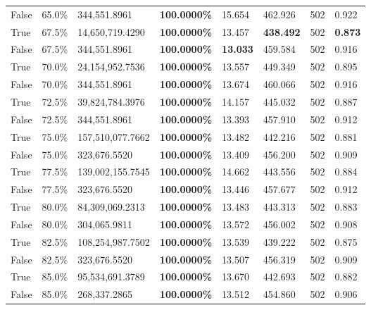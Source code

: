 \begin{table}[H]
{\begin{tabular}{lllrllll}
\cline{1-8}
False & 65.0\% & 344,551.8961 & \bfseries \color{red} 100.0000\% & 15.654 & 462.926 & 502 & 0.922 \\
\cline{1-8}
True & 67.5\% & 14,650,719.4290 & \bfseries \color{red} 100.0000\% & 13.457 & \bfseries \color{red} 438.492 & 502 & \bfseries \color{red} 0.873 \\
\cline{1-8}
False & 67.5\% & 344,551.8961 & \bfseries \color{red} 100.0000\% & \bfseries \color{red} 13.033 & 459.584 & 502 & 0.916 \\
\cline{1-8}
True & 70.0\% & 24,154,952.7536 & \bfseries \color{red} 100.0000\% & 13.557 & 449.349 & 502 & 0.895 \\
\cline{1-8}
False & 70.0\% & 344,551.8961 & \bfseries \color{red} 100.0000\% & 13.674 & 460.066 & 502 & 0.916 \\
\cline{1-8}
True & 72.5\% & 39,824,784.3976 & \bfseries \color{red} 100.0000\% & 14.157 & 445.032 & 502 & 0.887 \\
\cline{1-8}
False & 72.5\% & 344,551.8961 & \bfseries \color{red} 100.0000\% & 13.393 & 457.910 & 502 & 0.912 \\
\cline{1-8}
True & 75.0\% & 157,510,077.7662 & \bfseries \color{red} 100.0000\% & 13.482 & 442.216 & 502 & 0.881 \\
\cline{1-8}
False & 75.0\% & 323,676.5520 & \bfseries \color{red} 100.0000\% & 13.409 & 456.200 & 502 & 0.909 \\
\cline{1-8}
True & 77.5\% & 139,002,155.7545 & \bfseries \color{red} 100.0000\% & 14.662 & 443.556 & 502 & 0.884 \\
\cline{1-8}
False & 77.5\% & 323,676.5520 & \bfseries \color{red} 100.0000\% & 13.446 & 457.677 & 502 & 0.912 \\
\cline{1-8}
True & 80.0\% & 84,309,069.2313 & \bfseries \color{red} 100.0000\% & 13.483 & 443.313 & 502 & 0.883 \\
\cline{1-8}
False & 80.0\% & 304,065.9811 & \bfseries \color{red} 100.0000\% & 13.572 & 456.002 & 502 & 0.908 \\
\cline{1-8}
True & 82.5\% & 108,254,987.7502 & \bfseries \color{red} 100.0000\% & 13.539 & 439.222 & 502 & 0.875 \\
\cline{1-8}
False & 82.5\% & 323,676.5520 & \bfseries \color{red} 100.0000\% & 13.507 & 456.319 & 502 & 0.909 \\
\cline{1-8}
True & 85.0\% & 95,534,691.3789 & \bfseries \color{red} 100.0000\% & 13.670 & 442.693 & 502 & 0.882 \\
\cline{1-8}
False & 85.0\% & 268,337.2865 & \bfseries \color{red} 100.0000\% & 13.512 & 454.860 & 502 & 0.906 \\

\end{tabular}}
\end{table}
